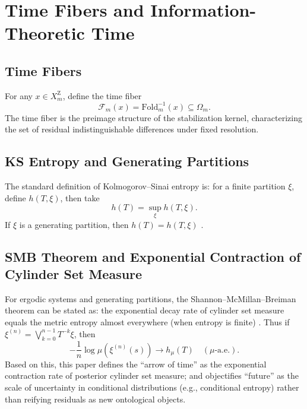 \section{Time Fibers and Information-Theoretic Time}
\label{sec:information-time}

\subsection{Time Fibers}

For any $x\in X_m^{\mathrm Z}$, define the time fiber
\[
\mathcal{F}_m(x)=\mathrm{Fold}_m^{-1}(x)\subseteq\Omega_m.
\]
The time fiber is the preimage structure of the stabilization kernel, characterizing the set of residual indistinguishable differences under fixed resolution.

\subsection{KS Entropy and Generating Partitions}

The standard definition of Kolmogorov--Sinai entropy is: for a finite partition $\xi$, define $h(T,\xi)$, then take
\[
h(T)=\sup_{\xi} h(T,\xi).
\]
If $\xi$ is a generating partition, then $h(T)=h(T,\xi)$ \cite{ScholarpediaKSEntropy}.

\subsection{SMB Theorem and Exponential Contraction of Cylinder Set Measure}

For ergodic systems and generating partitions, the Shannon--McMillan--Breiman theorem can be stated as: the exponential decay rate of cylinder set measure equals the metric entropy almost everywhere (when entropy is finite) \cite{GatechSMB}.
Thus if $\xi^{(n)}=\bigvee_{k=0}^{n-1}T^{-k}\xi$, then
\[
-\frac{1}{n}\log\mu(\xi^{(n)}(s))\to h_\mu(T)\quad(\mu\text{-a.e.}).
\]
Based on this, this paper defines the ``arrow of time'' as the exponential contraction rate of posterior cylinder set measure; and objectifies ``future'' as the scale of uncertainty in conditional distributions (e.g., conditional entropy) rather than reifying residuals as new ontological objects.
